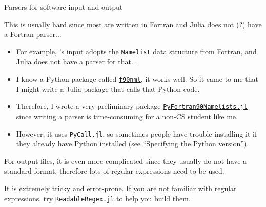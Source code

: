 \begin{frame}[allowframebreaks]{Parsers for \ab{} software input and output}

    This is usually hard since most \ab{} are written in Fortran and Julia does not (?)
    have a Fortran parser...

    \framebreak

    \begin{itemize}
        \item For example, \qe{}'s input adopts the \texttt{Namelist} data structure from
              Fortran, and Julia does not have a parser for that...
        \item I know a Python package called
              \href{https://github.com/marshallward/f90nml}{\texttt{f90nml}}, it works well.
              So it came to me that I might write a Julia package that calls that Python
              code.
        \item Therefore, I wrote a very preliminary package
              \href{https://github.com/singularitti/PyFortran90Namelists.jl}{\texttt{PyFortran90Namelists.jl}}
              since writing a parser is time-consuming for a non-CS student like me.
        \item However, it uses \texttt{PyCall.jl}, so sometimes people have trouble installing
              it if they already have Python installed
              (see \href{https://github.com/JuliaPy/PyCall.jl\#specifying-the-python-version}{``Specifying the Python version''}).
    \end{itemize}

    \framebreak

    For output files, it is even more complicated since they usually do not have a standard
    format, therefore lots of regular expressions need to be used.

    It is extremely tricky and error-prone. If you are not familiar with regular expressions,
    try \href{https://github.com/jkrumbiegel/ReadableRegex.jl}{\texttt{ReadableRegex.jl}} to help you build them.

\end{frame}


